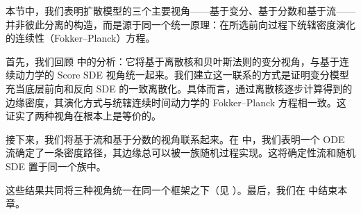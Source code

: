 本节中，我们表明扩散模型的三个主要视角——基于变分、基于分数和基于流——并非彼此分离的构造，而是源于同一个统一原理：在所选前向过程下统辖密度演化的连续性（Fokker–Planck）方程。


首先，我们回顾  中的分析：它将基于离散核和贝叶斯法则的变分视角，与基于连续动力学的 Score SDE 视角统一起来。我们建立这一联系的方式是证明变分模型充当底层前向和反向 SDE 的一致离散化。具体而言，通过离散核逐步计算得到的边缘密度，其演化方式与统辖连续时间动力学的 Fokker–Planck 方程相一致。这证实了两种视角在根本上是等价的。



 
 接下来，我们将基于流和基于分数的视角联系起来。在  中，我们表明一个 ODE 流确定了一条密度路径，其边缘总可以被一族随机过程实现。这将确定性流和随机 SDE 置于同一个族中。

这些结果共同将三种视角统一在同一个框架之下（见 ）。最后，我们在  中结束本章。









